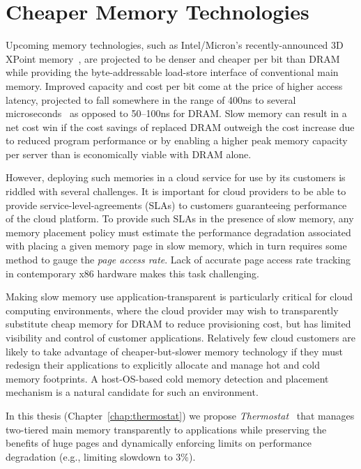 \section{Cheaper Memory Technologies}
Upcoming memory technologies, such as Intel/Micron's recently-announced 3D
XPoint memory~\cite{3dcrosspoint}, are projected to be denser and cheaper per
bit than DRAM while providing the byte-addressable load-store interface of
conventional main memory.  Improved capacity and cost per bit come at the price
of higher access latency, projected to fall somewhere in the range of 400ns to
several microseconds~\cite{3dcrosspoint} as opposed to 50--100ns for DRAM.  Slow
memory can result in a net cost win if the cost savings of replaced DRAM
outweigh the cost increase due to reduced program performance or by enabling a
higher peak memory capacity per server than is economically viable with DRAM
alone.

However, deploying such memories in a cloud service for use by its customers is
riddled with several challenges. It is important for cloud providers to be able
to provide service-level-agreements (SLAs) to customers guaranteeing performance
of the cloud platform. To provide such SLAs in the presence of slow memory, any
memory placement policy must estimate the performance degradation associated
with placing a given memory page in slow memory, which in turn requires some
method to gauge the {\it page access rate}. Lack of accurate page access rate
tracking in contemporary x86 hardware makes this task challenging.

Making slow memory use application-transparent is particularly critical for
cloud computing environments, where the cloud provider may wish to transparently
substitute cheap memory for DRAM to reduce provisioning cost, but has limited
visibility and control of customer applications.  Relatively few cloud customers
are likely to take advantage of cheaper-but-slower memory technology if they
must redesign their applications to explicitly allocate and manage hot and cold
memory footprints. A host-OS-based cold memory detection and placement mechanism
is a natural candidate for such an environment.

In this thesis (Chapter~\ref{chap:thermostat}) we propose {\it
Thermostat}~\cite{ref:agarwal:asplos2017:thermostat} that manages two-tiered
main memory transparently to applications while preserving the benefits of huge
pages and dynamically enforcing limits on performance degradation (e.g.,
limiting slowdown to 3\%).


